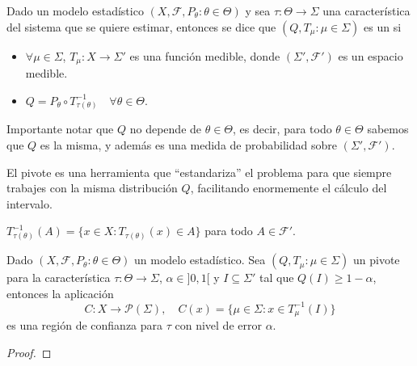 \begin{definicion}
    Dado un modelo estadístico $(X, \mathcal{F}, P_{\theta}: \theta \in \Theta)$ y sea  $\tau: \Theta \to \Sigma$ una característica del sistema que se quiere estimar, entonces se dice que $(Q, T_{\mu}:\mu\in \Sigma)$ es un  si
    \begin{itemize}
        \item $\forall \mu \in \Sigma$, $T_{\mu}: X \to \Sigma'$ es una función medible, donde $(\Sigma', \mathcal{F}')$ es un espacio medible.
        \item $Q=P_{\theta} \circ T_{\tau(\theta)}^{-1} \quad \forall \theta \in \Theta$.
    \end{itemize}
\end{definicion}

\begin{observacion}
    Importante notar que $Q$ no depende de $\theta \in \Theta$, es decir, para todo $\theta \in \Theta$ sabemos que $Q$ es la misma, y además es una medida de probabilidad sobre $(\Sigma', \mathcal{F}')$.
\end{observacion}
\noindent
El pivote es una herramienta que ``estandariza'' el problema para que siempre trabajes con la misma distribución $Q$, facilitando enormemente el cálculo del intervalo.
\begin{notacion}
    $T_{\tau(\theta)}^{-1}(A) = \{x \in X : T_{\tau(\theta)}(x) \in A\}$ para todo $A \in \mathcal{F}'$.
\end{notacion}

\begin{lema}
    Dado $(X, \mathcal{F}, P_{\theta}: \theta \in \Theta)$ un modelo estadístico. Sea $(Q, T_{\mu}:\mu\in \Sigma)$ un pivote para la característica $\tau: \Theta \to \Sigma$, $\alpha \in ]0,1[$ y $I\subseteq \Sigma'$ tal que $Q(I) \geq 1-\alpha$, entonces la aplicación
    \begin{equation*}
        C: X \to \mathcal{P}(\Sigma), \quad C(x) = \{\mu \in \Sigma : x\in T_{\mu}^{-1}(I)\}
    \end{equation*}
    es una región de confianza para $\tau$ con nivel de error $\alpha$.
    \begin{proof}
    \end{proof}
\end{lema}

